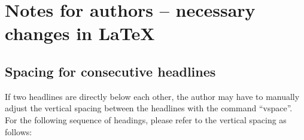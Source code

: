 \chapter{Notes for authors -- necessary changes in \LaTeX}
\label{chap:Notes}





\section{Spacing for consecutive headlines}
\label{sec:Spacing for consecutive headlines}
If two headlines are directly below each other, the author may have to manually adjust the vertical spacing between the headlines with the command ``vspace''. For the following sequence of head\-ings, please refer to the vertical spacing as follows:

